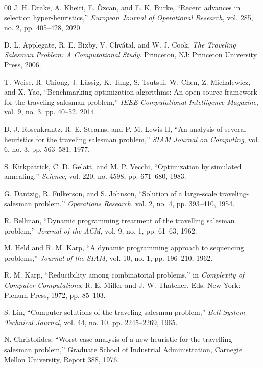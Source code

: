 \begin{thebibliography}{00}
 J. H. Drake, A. Kheiri, E. \"Ozcan, and E. K. Burke,
``Recent advances in selection hyper-heuristics,''
\textit{European Journal of Operational Research}, vol. 285, no. 2, pp. 405--428, 2020.

 D. L. Applegate, R. E. Bixby, V. Chv\'atal, and W. J. Cook,
\textit{The Traveling Salesman Problem: A Computational Study}.
Princeton, NJ: Princeton University Press, 2006.

 T. Weise, R. Chiong, J. L\"assig, K. Tang, S. Tsutsui, W. Chen, Z. Michalewicz, and X. Yao,
``Benchmarking optimization algorithms: An open source framework for the traveling salesman problem,''
\textit{IEEE Computational Intelligence Magazine}, vol. 9, no. 3, pp. 40--52, 2014.

 D. J. Rosenkrantz, R. E. Stearns, and P. M. Lewis II,
``An analysis of several heuristics for the traveling salesman problem,''
\textit{SIAM Journal on Computing}, vol. 6, no. 3, pp. 563--581, 1977.

 S. Kirkpatrick, C. D. Gelatt, and M. P. Vecchi,
``Optimization by simulated annealing,''
\textit{Science}, vol. 220, no. 4598, pp. 671--680, 1983.

 G. Dantzig, R. Fulkerson, and S. Johnson,
``Solution of a large-scale traveling-salesman problem,''
\textit{Operations Research}, vol. 2, no. 4, pp. 393--410, 1954.

 R. Bellman,
``Dynamic programming treatment of the travelling salesman problem,''
\textit{Journal of the ACM}, vol. 9, no. 1, pp. 61--63, 1962.

 M. Held and R. M. Karp,
``A dynamic programming approach to sequencing problems,''
\textit{Journal of the SIAM}, vol. 10, no. 1, pp. 196--210, 1962.

 R. M. Karp,
``Reducibility among combinatorial problems,''
in \textit{Complexity of Computer Computations}, R. E. Miller and J. W. Thatcher, Eds.
New York: Plenum Press, 1972, pp. 85--103.

 S. Lin,
``Computer solutions of the traveling salesman problem,''
\textit{Bell System Technical Journal}, vol. 44, no. 10, pp. 2245--2269, 1965.

 N. Christofides,
``Worst-case analysis of a new heuristic for the travelling salesman problem,''
Graduate School of Industrial Administration, Carnegie Mellon University,
Report 388, 1976.


\end{thebibliography}
